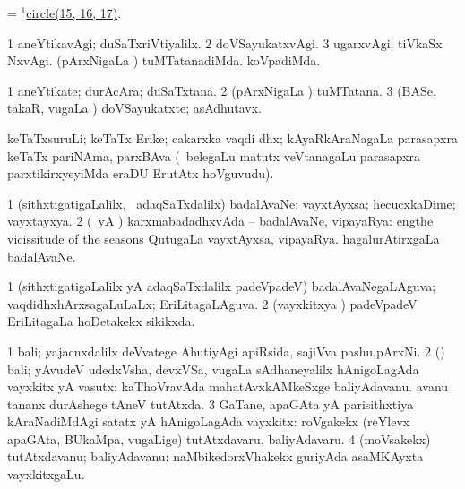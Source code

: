 \bentry
{}
\gl{\nA}
\expl{}
\bmng
 = \hyperref{kandict_c.pdf}{C}{circle(1)15}{$^1$circle(15, 16, 17)}. 
\emng
\eentry

\bentry
{} 
\gl{\kirxvi}
\expl{}
\bmng
\bnum
\num{1} aneYtikavAgi; duSaTxriVtiyalilx. 
\num{2} doVSayukatxvAgi. 
\num{3} ugarxvAgi; tiVkaSx NxvAgi. 
 (pArxNigaLa \vi) 
\banum
{} tuMTatanadiMda. 
 koVpadiMda. 
\eanum
\numie
\enum
\emng
\eentry

\bentry
{} 
\gl{\nA}
\expl{}
\bmng
\bnum
\num{1} aneYtikate; durAcAra; duSaTxtana. 
\num{2} (pArxNigaLa \vi) tuMTatana. 
\num{3} (BASe, takaR, \mo vugaLa \vi) doVSayukatxte; asAdhutavx. 
\enum
\emng
\eentry

\bentry
{}
\gl{\nA}
\expl{}
\bmng
 keTaTxsuruLi; keTaTx Erike; cakarxka vaqdi dhx; kAyaRkAraNagaLa parasapxra keTaTx pariNAma, parxBAva (\kanmu\ belegaLu matutx veVtanagaLu parasapxra parxtikirxyeyiMda eraDU ErutAtx hoVguvudu). 
\emng
\eentry

\bentry
{} 
\gl{\nA}
\expl{}
\bmng
\bnum
\num{1} (sithxtigatigaLalilx, \kanmu\ adaqSaTxdalilx) badalAvaNe; vayxtAyxsa; hecucxkaDime; vayxtayxya. 
\num{2} (\pArxparx\ yA \kAparx) karxmabadadhxvAda -- badalAvaNe, vipayaRya: eng{the vicissitude of the seasons} QutugaLa vayxtAyxsa, vipayaRya.  hagalurAtirxgaLa badalAvaNe. 
\enum
\emng
\eentry

\bentry
{} 
\gl{\gu}
\expl{}
\bmng
\bnum
\num{1} (sithxtigatigaLalilx yA adaqSaTxdalilx padeVpadeV) badalAvaNegaLAguva; vaqdidhxhArxsagaLuLaLx; EriLitagaLAguva. 
\num{2} (vayxkitxya \vi) padeVpadeV EriLitagaLa hoDetakekx sikikxda. 
\enum
\emng
\eentry

\bentry
{} 
\gl{\nA}
\expl{}
\bmng
\bnum
\num{1} bali; yajacnxdalilx deVvatege AhutiyAgi apiRsida, sajiVva pashu,pArxNi. 
\num{2} (\rUpa) bali; yAvudeV udedxVsha, devxVSa, \mo vugaLa sAdhaneyalilx hAnigoLagAda vayxkitx yA vasutx:  kaThoVravAda mahatAvxkAMkeSxge baliyAdavanu.  avanu tananx durAshege tAneV tutAtxda. 
\num{3} GaTane, apaGAta yA parisithxtiya kAraNadiMdAgi satatx yA hAnigoLagAda vayxkitx:  roVgakekx (reYlevx apaGAta, BUkaMpa, \mo vugaLige) tutAtxdavaru, baliyAdavaru. 
\num{4} (moVsakekx) tutAtxdavanu; baliyAdavanu:  naMbikedorxVhakekx guriyAda asaMKAyxta vayxkitxgaLu. 
\enum
\emng
\eentry

